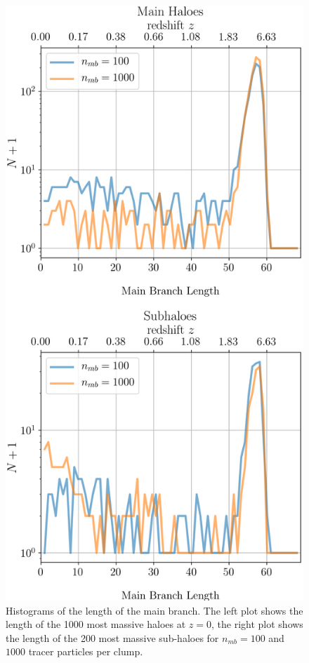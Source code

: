 \begin{figure}
	\centering
	\includegraphics[width=.95\linewidth, keepaspectratio]{images/tree-statistics-sussing-threshold/main-branch-lenghts-all-bins-ntrace.png}%
	\caption{
		Histograms of the length of the main branch. 
		The left plot shows the length of the 1000 most massive haloes at $z = 0$, the right plot shows the length of the 200 most massive sub-haloes for $n_{mb} = 100$ and $1000$ tracer particles per clump.
	}%
	\label{fig:sussing-branch-lengths}
\end{figure}

